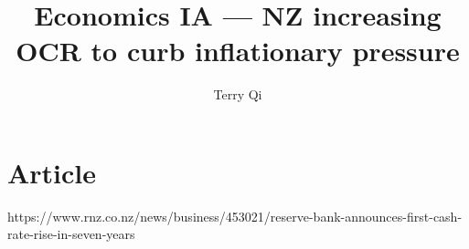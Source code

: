 \documentclass[a4paper,12pt]{article}
\title{Economics IA --- NZ increasing OCR to curb inflationary pressure}
\author{Terry Qi}
\begin{document}
\maketitle
\newpage

\section{Article}

https://www.rnz.co.nz/news/business/453021/reserve-bank-announces-first-cash-rate-rise-in-seven-years
\end{document}

